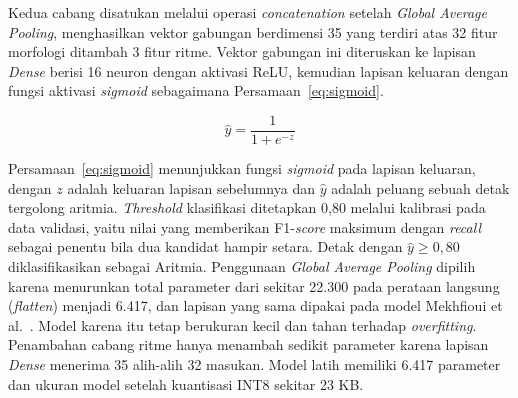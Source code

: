 Kedua cabang disatukan melalui operasi \textit{concatenation} setelah
\textit{Global Average Pooling}, menghasilkan vektor gabungan berdimensi 35
yang terdiri atas 32 fitur morfologi ditambah 3 fitur ritme. Vektor gabungan
ini diteruskan ke lapisan \textit{Dense} berisi 16 neuron dengan aktivasi
ReLU, kemudian lapisan
keluaran dengan fungsi aktivasi \textit{sigmoid} sebagaimana
Persamaan~\ref{eq:sigmoid}.

\begin{equation}
\label{eq:sigmoid}
\hat{y} = \frac{1}{1+e^{-z}}
\end{equation}

Persamaan~\ref{eq:sigmoid} menunjukkan fungsi \textit{sigmoid} pada lapisan
keluaran, dengan $z$ adalah keluaran lapisan sebelumnya dan $\hat{y}$ adalah
peluang sebuah detak tergolong aritmia. \textit{Threshold} klasifikasi ditetapkan
0,80 melalui kalibrasi pada data validasi, yaitu nilai yang memberikan F1-\textit{score}
maksimum dengan \textit{recall} sebagai penentu bila dua kandidat hampir setara.
Detak dengan $\hat{y} \geq 0{,}80$ diklasifikasikan sebagai Aritmia.
Penggunaan \textit{Global Average Pooling} dipilih
karena menurunkan total parameter dari sekitar 22.300 pada perataan langsung
(\textit{flatten}) menjadi 6.417, dan lapisan yang sama dipakai pada model Mekhfioui
et al.~\cite{mekhfioui_2025}. Model karena itu tetap berukuran kecil dan tahan terhadap
\textit{overfitting}. Penambahan cabang ritme hanya menambah sedikit
parameter karena lapisan \textit{Dense} menerima 35 alih-alih 32 masukan.
Model latih memiliki 6.417 parameter dan ukuran model setelah
kuantisasi INT8 sekitar 23 KB.

